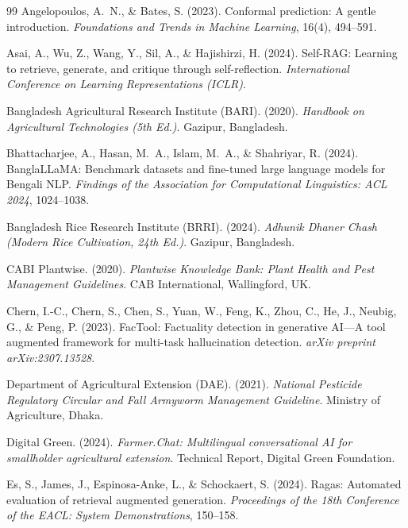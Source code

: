 \documentclass[11pt,a4paper]{article}
\begin{document}
\begin{thebibliography}{99}
 Angelopoulos, A.~N., \& Bates, S. (2023). Conformal prediction: A gentle introduction. \textit{Foundations and Trends in Machine Learning}, 16(4), 494--591.

 Asai, A., Wu, Z., Wang, Y., Sil, A., \& Hajishirzi, H. (2024). Self-RAG: Learning to retrieve, generate, and critique through self-reflection. \textit{International Conference on Learning Representations (ICLR)}.

 Bangladesh Agricultural Research Institute (BARI). (2020). \textit{Handbook on Agricultural Technologies (5th Ed.)}. Gazipur, Bangladesh.

 Bhattacharjee, A., Hasan, M.~A., Islam, M.~A., \& Shahriyar, R. (2024). BanglaLLaMA: Benchmark datasets and fine-tuned large language models for Bengali NLP. \textit{Findings of the Association for Computational Linguistics: ACL 2024}, 1024--1038.

 Bangladesh Rice Research Institute (BRRI). (2024). \textit{Adhunik Dhaner Chash (Modern Rice Cultivation, 24th Ed.)}. Gazipur, Bangladesh.

 CABI Plantwise. (2020). \textit{Plantwise Knowledge Bank: Plant Health and Pest Management Guidelines}. CAB International, Wallingford, UK.

 Chern, I.-C., Chern, S., Chen, S., Yuan, W., Feng, K., Zhou, C., He, J., Neubig, G., \& Peng, P. (2023). FacTool: Factuality detection in generative AI---A tool augmented framework for multi-task hallucination detection. \textit{arXiv preprint arXiv:2307.13528}.

 Department of Agricultural Extension (DAE). (2021). \textit{National Pesticide Regulatory Circular and Fall Armyworm Management Guideline}. Ministry of Agriculture, Dhaka.

 Digital Green. (2024). \textit{Farmer.Chat: Multilingual conversational AI for smallholder agricultural extension}. Technical Report, Digital Green Foundation.

 Es, S., James, J., Espinosa-Anke, L., \& Schockaert, S. (2024). Ragas: Automated evaluation of retrieval augmented generation. \textit{Proceedings of the 18th Conference of the EACL: System Demonstrations}, 150--158.


\end{thebibliography}
\end{document}
